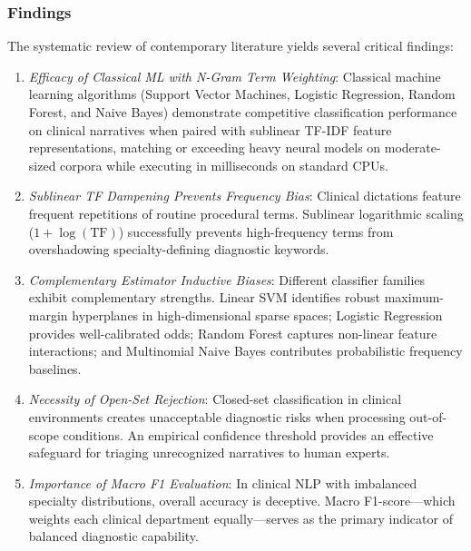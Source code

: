 \subsubsection{Findings}
The systematic review of contemporary literature yields several critical findings:
\begin{enumerate}
    \item \textit{Efficacy of Classical ML with N-Gram Term Weighting}: Classical machine learning algorithms (Support Vector Machines, Logistic Regression, Random Forest, and Naive Bayes) demonstrate competitive classification performance on clinical narratives when paired with sublinear TF-IDF feature representations, matching or exceeding heavy neural models on moderate-sized corpora while executing in milliseconds on standard CPUs.
    \item \textit{Sublinear TF Dampening Prevents Frequency Bias}: Clinical dictations feature frequent repetitions of routine procedural terms. Sublinear logarithmic scaling ($1 + \log(\text{TF})$) successfully prevents high-frequency terms from overshadowing specialty-defining diagnostic keywords.
    \item \textit{Complementary Estimator Inductive Biases}: Different classifier families exhibit complementary strengths. Linear SVM identifies robust maximum-margin hyperplanes in high-dimensional sparse spaces; Logistic Regression provides well-calibrated odds; Random Forest captures non-linear feature interactions; and Multinomial Naive Bayes contributes probabilistic frequency baselines.
    \item \textit{Necessity of Open-Set Rejection}: Closed-set classification in clinical environments creates unacceptable diagnostic risks when processing out-of-scope conditions. An empirical confidence threshold provides an effective safeguard for triaging unrecognized narratives to human experts.
    \item \textit{Importance of Macro F1 Evaluation}: In clinical NLP with imbalanced specialty distributions, overall accuracy is deceptive. Macro F1-score---which weights each clinical department equally---serves as the primary indicator of balanced diagnostic capability.
\end{enumerate}

